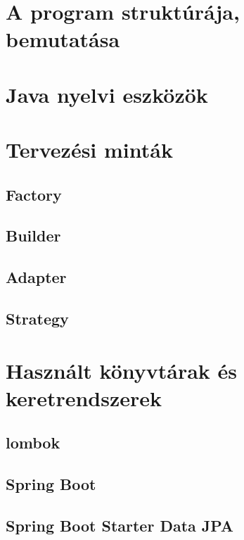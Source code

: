 \section{A program struktúrája, bemutatása}

\section{Java nyelvi eszközök}

\section{Tervezési minták}

\subsection{Factory}

\subsection{Builder}

\subsection{Adapter}

\subsection{Strategy}

\section{Használt könyvtárak és keretrendszerek}

\subsection{lombok}



\subsection{Spring Boot}

\subsection{Spring Boot Starter Data JPA}

